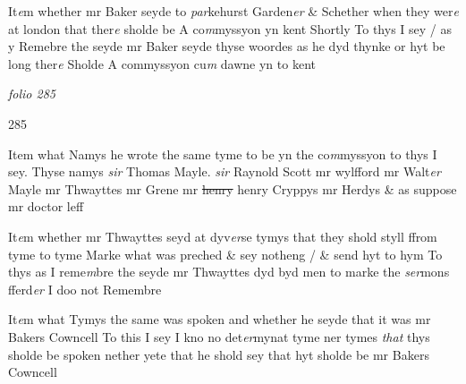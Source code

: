 \documentclass[12pt, a4paper]{book}
\begin{document}
				\marginpar[\vspace{0.5cm}{\textcolor{Gray}{16}}]{}
			

		\ifthenelse{\isodd{\thepage}}
		{\reversemarginpar}
		{\normalmarginpar}
		 It\textit{e}m whether mr Baker seyde to \textit{par}kehurst Garden\textit{er} \& Schether
when they wer\textit{e} at london that ther\textit{e} sholde be A co\textit{m}myssyon yn kent
Shortly
To thys I sey / as y Remebre the seyde mr Baker seyde thyse woordes
as he dyd thynke or hyt be long ther\textit{e} Sholde A commyssyon cu\textit{m}
dawne yn to kent

\dotfill
						\newpage
{}

\textit{folio 285}


 	\begin{flushright}{\color{Mahogany}285}\end{flushright}

 	
				\marginpar[\vspace{0.5cm}{\textcolor{Gray}{11}}]{}
			

		\ifthenelse{\isodd{\thepage}}
		{\reversemarginpar}
		{\normalmarginpar}
		 Item what Namys he wrote the same tyme to be yn the co\textit{m}myssyon
to thys I sey. Thyse namys \textit{sir }Thomas Mayle. \textit{sir} Raynold Scott mr
wylfford mr Walt\textit{er} Mayle mr Thwayttes mr Grene mr \sout{henry }henry
Cryppys mr Herdys \& as suppose mr doctor leff  

 	
				\marginpar[\vspace{0.5cm}{\textcolor{Gray}{18}}]{}
			

		\ifthenelse{\isodd{\thepage}}
		{\reversemarginpar}
		{\normalmarginpar}
		 It\textit{e}m whether mr Thwayttes seyd at dyv\textit{er}se tymys that they shold styll
ffrom tyme to tyme Marke what was preched \& sey notheng / \& send hyt
to hym
To thys as I reme\textit{m}bre the seyde mr Thwayttes dyd byd men to marke the
\textit{ser}mons fferd\textit{er} I doo not Remembre

 	
				\marginpar[\vspace{0.5cm}{\textcolor{Gray}{19}}]{}
			

		\ifthenelse{\isodd{\thepage}}
		{\reversemarginpar}
		{\normalmarginpar}
		 It\textit{e}m what Tymys the same was spoken and whether he seyde that
it was mr Bakers Cowncell
To this I sey I kno no det\textit{er}mynat tyme ner tymes \textit{that} thys sholde be spoken
nether yete that he shold sey that hyt sholde be mr Bakers Cowncell

 	
				\marginpar[\vspace{0.5cm}{\textcolor{Gray}{20}}]{}
			
\end{document}
